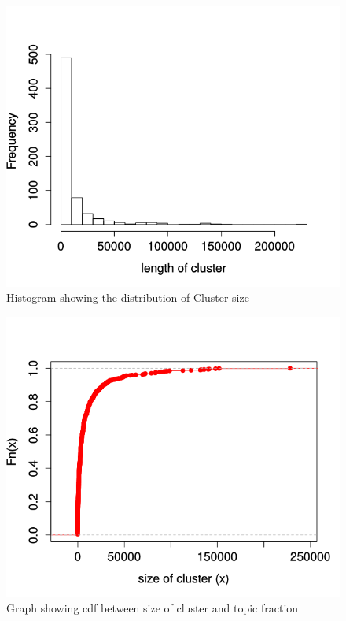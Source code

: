 \begin{figure}[htbp]
\begin{center}
  \includegraphics[scale=0.5]{figures/histclustersize.png}
\end{center}
\caption{Histogram showing the distribution of Cluster size}
\label{fig:histclustersize}
\end{figure}
\begin{figure}[htbp]
\begin{center}
  \includegraphics[scale=0.5]{figures/ecdfclustersize.png}
\end{center}
\caption{Graph showing cdf between size of cluster and topic fraction}
\label{fig:ecdfclustersize}
\end{figure}
